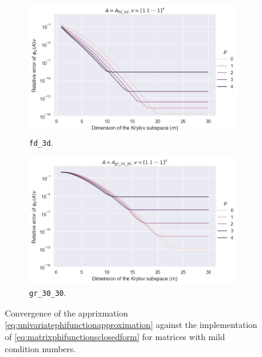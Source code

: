 \begin{figure}[h!]
    \centering
    \begin{subfigure}[b]{0.45\textwidth}
        \includegraphics[width=\textwidth]{img/krylovunivariate/fd_3d_recursive.png}
        \caption{\texttt{fd\_3d}.}
    \end{subfigure}
    \hfill
    \begin{subfigure}[b]{0.45\textwidth}
        \includegraphics[width=\textwidth]{img/krylovunivariate/gr_30_30_recursive.png}
        \caption{\texttt{gr\_30\_30}.}
    \end{subfigure}
    \caption{Convergence of the apprixmation \eqref{eq:univariatephifunctionapproximation} against
    the implementation of \eqref{eq:matrixphifunctionsclosedform} for matrices with mild condition numbers.}
    \label{fig:krylovmethodunivariateevaluationrecursive}
\end{figure}


